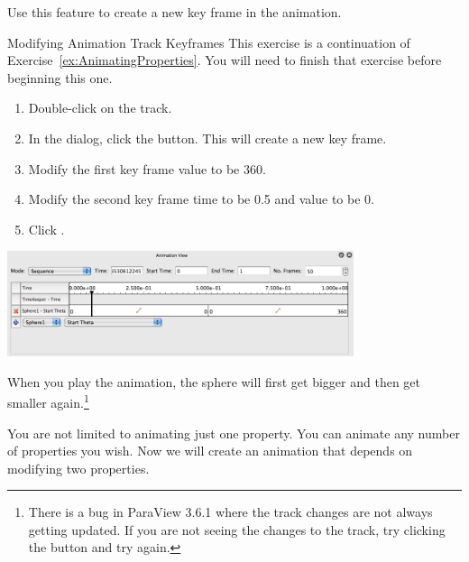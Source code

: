 Use this feature to create a new key frame in the animation.

\begin{exercise}{Modifying Animation Track Keyframes}
  \label{ex:ModifyingAnimationTrackKeyframes}%
  This exercise is a continuation of Exercise~\ref{ex:AnimatingProperties}.
  You will need to finish that exercise before beginning this one.

  \begin{enumerate}
  \item Double-click on the  track.
  \item In the  dialog, click the 
    button.  This will create a new key frame.
  \item Modify the first key frame value to be 360.
  \item Modify the second key frame time to be 0.5 and value to be 0.
  \item Click .
  \end{enumerate}

  \begin{inlinefig}
    \includegraphics[width=4in]{images/BuildAnimation2}
  \end{inlinefig}

  When you play the animation, the sphere will first get bigger and then get
  smaller again.\footnote{There is a bug in ParaView 3.6.1 where the track
    changes are not always getting updated.  If you are not seeing the
    changes to the  track, try clicking the \vcrFirst
    button and try again.}
\end{exercise}

You are not limited to animating just one property.  You can animate any
number of properties you wish.  Now we will create an animation that
depends on modifying two properties.

